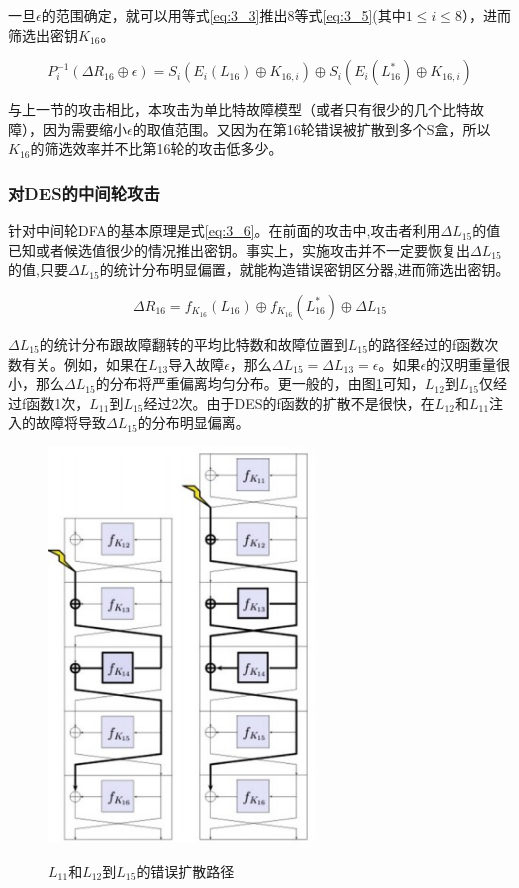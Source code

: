 \documentclass[a4paper,12pt]{article}
\begin{document}
\begin{CJK}{UTF8}{gkai}
一旦$\epsilon$的范围确定，就可以用等式\ref{eq:3_3}推出8等式\ref{eq:3_5}(其中$1 \leq i \leq 8$），进而筛选出密钥$K_{16}$。

\begin{equation}
\label{eq:3_5}
P_i^{-1}(\Delta R_{16} \oplus \epsilon) = S_i(E_i(L_{16}) \oplus K_{16,i}) \oplus S_i(E_i(L_{16}^*) \oplus K_{16,i})
\end{equation}

与上一节的攻击相比，本攻击为单比特故障模型（或者只有很少的几个比特故障），因为需要缩小$\epsilon$的取值范围。又因为在第16轮错误被扩散到多个S盒，所以$K_{16}$的筛选效率并不比第16轮的攻击低多少。

\subsubsection{对DES的中间轮攻击}
针对中间轮DFA的基本原理是式\ref{eq:3_6}。在前面的攻击中,攻击者利用$\Delta L_{15}$的值已知或者候选值很少的情况推出密钥。事实上，实施攻击并不一定要恢复出$\Delta L_{15}$的值,只要$\Delta L_{15}$的统计分布明显偏置，就能构造错误密钥区分器,进而筛选出密钥。

\begin{equation}
\label{eq:3_6}
\Delta R_{16} = f_{K_{16}}(L_{16}) \oplus f_{K_{16}}(L_{16}^*) \oplus \Delta L_{15}
\end{equation}

$\Delta L_{15}$的统计分布跟故障翻转的平均比特数和故障位置到$L_{15}$的路径经过的f函数次数有关。例如，如果在$L_{13}$导入故障$\epsilon$，那么$\Delta L_{15} = \Delta L_{13} = \epsilon$。如果$\epsilon$的汉明重量很小，那么$\Delta L_{15}$的分布将严重偏离均匀分布。更一般的，由图\ref{des_error_propagation}可知，$L_{12}$到$L_{15}$仅经过f函数1次，$L_{11}$到$L_{15}$经过2次。由于DES的f函数的扩散不是很快，在$L_{12}$和$L_{11}$注入的故障将导致$\Delta L_{15}$的分布明显偏离。

\begin{figure}
\centering
\caption{$L_{11}$和$L_{12}$到$L_{15}$的错误扩散路径}
\includegraphics[width=200pt]{des_error_propagation.jpg}
\label{des_error_propagation}
\end{figure}


\end{CJK}
\end{document}

